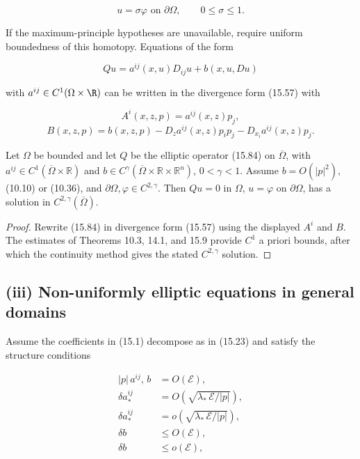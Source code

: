 \[
u=\sigma\varphi \text{ on } \partial\Omega,\qquad 0\leq \sigma \leq 1.
\]

If the maximum-principle hypotheses are unavailable, require uniform boundedness
of this homotopy. Equations of the form

\begin{equation}\tag{15.84}
Qu=a^{ij}(x,u)D_{ij}u+b(x,u,Du)
\end{equation}

with \(a^{ij}\in C^1(\Omega\times \R)\) can be written in the divergence form (15.57) with

\[
A^i(x,z,p)=a^{ij}(x,z)p_j,
\]
\[
B(x,z,p)=b(x,z,p)-D_z a^{ij}(x,z)p_ip_j-D_{x_i}a^{ij}(x,z)p_j.
\]


\medskip

\begin{theorem}\label{gilbarg-trudinger.thm.15.12.nondivergence-existence}
Let \(\Omega\) be bounded and let \(Q\) be the elliptic operator (15.84) on
\(\overline\Omega\), with \(a^{ij}\in C^1(\overline\Omega\times\mathbb R)\) and
\(b\in C^\gamma(\overline\Omega\times\mathbb R\times\mathbb R^n)\), \(0<\gamma<1\).
Assume \(b=O(|p|^2)\), (10.10) or (10.36), and
\(\partial\Omega,\varphi\in C^{2,\gamma}\). Then \(Qu=0\) in \(\Omega\),
\(u=\varphi\) on \(\partial\Omega\), has a solution in
\(C^{2,\gamma}(\overline\Omega)\).
\end{theorem}
\begin{proof}
\sketch Rewrite (15.84) in divergence form (15.57) using the displayed
\(A^i\) and \(B\). The estimates of Theorems 10.3, 14.1, and 15.9 provide
\(C^1\) a priori bounds, after which the continuity method gives the stated
\(C^{2,\gamma}\) solution.
\end{proof}

\medskip

\subsection*{(iii) Non-uniformly elliptic equations in general domains}
Assume the coefficients in (15.1) decompose as in (15.23) and satisfy
the structure conditions

\begin{equation}\tag{15.85}
\begin{aligned}
|p|\, a^{ij},\, b &= O(\mathcal{E}), \\
\delta a^{ij}_* &= O\!\left(\sqrt{\lambda_*\,\mathcal{E}/|p|}\right), \\
\delta a_*^{ij} &= o\!\left(\sqrt{\lambda_*\,\mathcal{E}/|p|}\right), \\
\delta b &\leq O(\mathcal{E}), \\
\delta b &\leq o(\mathcal{E}),
\end{aligned}
\end{equation}

